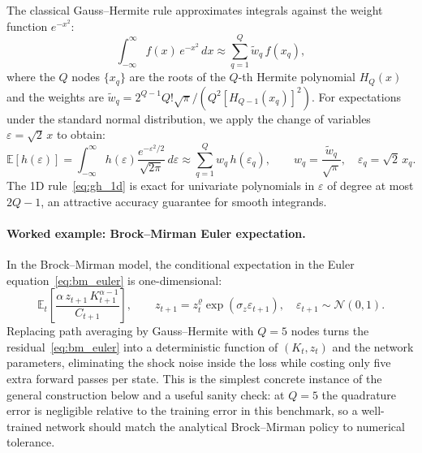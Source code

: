 \documentclass[11pt,a4paper]{report}
\newcommand{\E}[1]{\mathbb{E}\!\left[#1\right]}
\begin{document}
The classical Gauss--Hermite rule approximates integrals against the weight function $e^{-x^2}$:
\begin{equation}
\int_{-\infty}^{\infty} f(x)\, e^{-x^2}\, dx \approx \sum_{q=1}^{Q} \tilde{w}_q\, f(x_q),
\end{equation}
where the $Q$ nodes $\{x_q\}$ are the roots of the $Q$-th Hermite polynomial $H_Q(x)$ and the weights are $\tilde{w}_q = 2^{Q-1} Q!\sqrt{\pi}/(Q^2 [H_{Q-1}(x_q)]^2)$.  For expectations under the standard normal distribution, we apply the change of variables $\varepsilon = \sqrt{2}\, x$ to obtain:
\begin{equation}
\E{h(\varepsilon)} = \int_{-\infty}^{\infty} h(\varepsilon)\frac{e^{-\varepsilon^2/2}}{\sqrt{2\pi}}\,d\varepsilon \approx \sum_{q=1}^{Q} w_q\, h(\varepsilon_q),
\qquad w_q = \frac{\tilde{w}_q}{\sqrt{\pi}},\quad \varepsilon_q = \sqrt{2}\,x_q.
\label{eq:gh_1d}
\end{equation}
The 1D rule~\eqref{eq:gh_1d} is exact for univariate polynomials in $\varepsilon$ of degree at most $2Q-1$, an attractive accuracy guarantee for smooth integrands.

\paragraph{Worked example: Brock--Mirman Euler expectation.}  In the Brock--Mirman model, the conditional expectation in the Euler equation~\eqref{eq:bm_euler} is one-dimensional:
\begin{equation}
\mathbb{E}_t\!\left[
\frac{\alpha\, z_{t+1}\,K_{t+1}^{\alpha-1}}{C_{t+1}}
\right],
\qquad
z_{t+1}=z_t^{\varrho}\exp(\sigma_z\varepsilon_{t+1}),
\quad
\varepsilon_{t+1}\sim\mathcal{N}(0,1).
\end{equation}
Replacing path averaging by Gauss--Hermite with $Q=5$ nodes turns the residual~\eqref{eq:bm_euler} into a deterministic function of $(K_t, z_t)$ and the network parameters, eliminating the shock noise inside the loss while costing only five extra forward passes per state.  This is the simplest concrete instance of the general construction below and a useful sanity check: at $Q=5$ the quadrature error is negligible relative to the training error in this benchmark, so a well-trained network should match the analytical Brock--Mirman policy to numerical tolerance.
\end{document}
